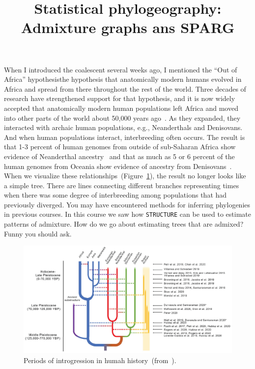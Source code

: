 \documentclass[12pt]{article}
\title{Statistical phylogeography: Admixture graphs ans SPARG}
\begin{document}
\maketitle

\thispagestyle{first}

When I introduced the coalescent several weeks ago, I mentioned the
``Out of Africa'' hypothesis{\dash}the hypothesis that anatomically
modern humans evolved in Africa and spread from there throughout the
rest of the world. Three decades of research have strengthened support
for that hypothesis, and it is now widely accepted that anatomically
modern human populations left Africa and moved into other parts of the
world about 50,000 years ago~\cite{Karmin-etal-2015}. As they
expanded, they interacted with archaic human populations, e.g.,
Neanderthals and Denisovans. And when human populations interact,
interbreeding often occurs. The result is that 1-3 percent of human
genomes from outside of sub-Saharan Africa show evidence of
Neanderthal ancestry~\cite{Prufer-etal-2014} and that as much as 5 or
6 percent of the human genomes from Oceania show evidence of ancestry
from Denisovans~\cite{Meyer-etal-2012}. When we visualize these
relationships~(Figure~\ref{fig:human-neanderthal-denisovan}), the
result no longer looks like a simple tree. There are lines connecting
different branches representing times when there was some degree of
interbreeding among populations that had previously diverged. You may
have encountered methods for inferring phylogenies in previous
courses. In this course we saw how {\tt STRUCTURE} can be used to
estimate patterns of admixture. How do we go about estimating trees
that are admixed? Funny you should ask.

\begin{figure}
  \begin{center}
    \includegraphics[width=14cm]{human-neanderthal-denisovan.eps}
  \end{center}
  \caption{Periods of introgression in humah
    history~(from~\cite{Ahlquist-etal-2021}).}\label{fig:human-neanderthal-denisovan}
\end{figure}
\end{document}
